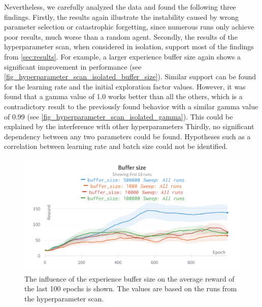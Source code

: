 \documentclass{article}
\begin{document}
Nevertheless, we carefully analyzed the data and found the following three findings.
Firstly, the results again illustrate the instability caused by wrong parameter selection or catastrophic forgetting, 
since numerous runs only achieve poor results, much worse than a random agent. 
Secondly, the results of the hyperparameter scan, when considered in isolation, 
support most of the findings from \autoref{sec:results}. 
For example, a larger experience buffer size again shows a significant improvement in performance (see \autoref{fig_hyperparameter_scan_isolated_buffer_size}). 
Similar support can be found for the learning rate and the initial exploration factor values.
However, it was found that a gamma value of 1.0 works better than all the others, 
which is a contradictory result to the previously found behavior with a similar gamma value of 0.99 (see \autoref{fig_hyperparameter_scan_isolated_gamma}).
This could be explained by the interference with other hyperparameters
Thirdly, no significant dependency between any two parameters could be found.
Hypotheses such as a correlation between learning rate and batch size could not be identified. 

\begin{figure}[ht!]
   \centering
   \includegraphics[width=\columnwidth]{assets/hyperparamter-scan/W&B Chart Buffer size.png}
   \caption{The influence of the experience buffer size on the average reward of the last 100 epochs is shown. The values are based on the runs from the hyperparameter scan.
   }
   \label{fig_hyperparameter_scan_isolated_buffer_size}
\end{figure}
\end{document}
